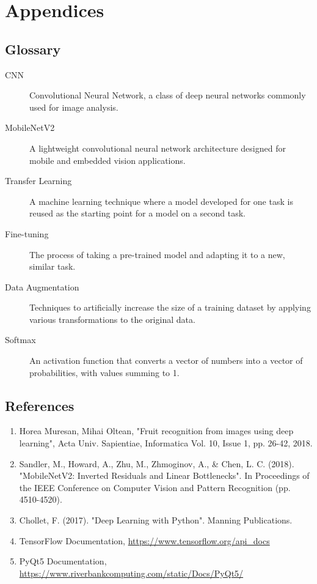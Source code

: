 \documentclass[11pt,a4paper]{report}
\begin{document}
\chapter{Appendices}

\section{Glossary}
\begin{description}
    \item[CNN] Convolutional Neural Network, a class of deep neural networks commonly used for image analysis.
    \item[MobileNetV2] A lightweight convolutional neural network architecture designed for mobile and embedded vision applications.
    \item[Transfer Learning] A machine learning technique where a model developed for one task is reused as the starting point for a model on a second task.
    \item[Fine-tuning] The process of taking a pre-trained model and adapting it to a new, similar task.
    \item[Data Augmentation] Techniques to artificially increase the size of a training dataset by applying various transformations to the original data.
    \item[Softmax] An activation function that converts a vector of numbers into a vector of probabilities, with values summing to 1.
\end{description}

\section{References}
\begin{enumerate}
    \item Horea Muresan, Mihai Oltean, "Fruit recognition from images using deep learning", Acta Univ. Sapientiae, Informatica Vol. 10, Issue 1, pp. 26-42, 2018.
    \item Sandler, M., Howard, A., Zhu, M., Zhmoginov, A., \& Chen, L. C. (2018). "MobileNetV2: Inverted Residuals and Linear Bottlenecks". In Proceedings of the IEEE Conference on Computer Vision and Pattern Recognition (pp. 4510-4520).
    \item Chollet, F. (2017). "Deep Learning with Python". Manning Publications.
    \item TensorFlow Documentation, \url{https://www.tensorflow.org/api_docs}
    \item PyQt5 Documentation, \url{https://www.riverbankcomputing.com/static/Docs/PyQt5/}
\end{enumerate}
\end{document}

